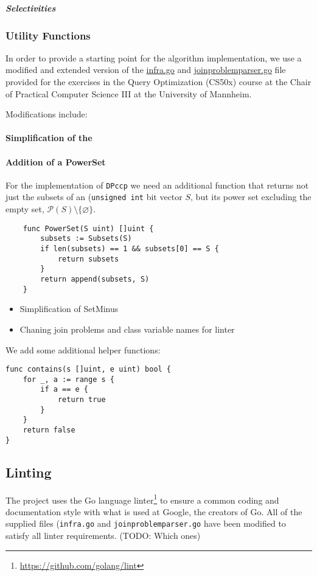 \subparagraph{Selectivities}



\subsubsection{Utility Functions}


In order to provide a starting point for the algorithm implementation, we use a modified and extended version of the \url{infra.go} and \url{joinproblemparser.go} file provided for the exercises in the Query Optimization (CS50x) course \texttt{} at the Chair of Practical Computer Science III at the University of Mannheim.

Modifications include:
\paragraph{Simplification of the }

\paragraph{Addition of a PowerSet}
For the implementation of \texttt{DPccp} we need an additional function that returns not just the subsets of an (\texttt{unsigned int} bit vector $S$, but its power set excluding the empty set, $\mathcal P(S)\setminus\{\varnothing\}$.

\begin{verbatim}
    func PowerSet(S uint) []uint {
        subsets := Subsets(S)
        if len(subsets) == 1 && subsets[0] == S {
            return subsets
        }
        return append(subsets, S)
    }
\end{verbatim}

\begin{itemize}
    \item Simplification of SetMinus
    \item Chaning join problems and class variable names for linter
\end{itemize}


We add some additional helper functions:
\begin{verbatim}   
func contains(s []uint, e uint) bool {
    for _, a := range s {
        if a == e {
            return true
        }
    }
    return false
}    
\end{verbatim}

\subsection{Linting}
The project uses the Go language linter\footnote{\url{https://github.com/golang/lint}} to ensure a common coding and documentation style with what is used at Google, the creators of Go.
All of the supplied files (\texttt{infra.go} and \texttt{joinproblemparser.go} have been modified to satisfy all linter requirements. (TODO: Which ones)

